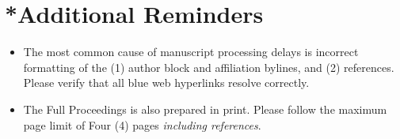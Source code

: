 \documentclass[10pt,a4paper,twoside]{article}
\begin{document}
\section*{*Additional Reminders}
\begin{itemize}
    \item The most common cause of manuscript processing delays is incorrect formatting of the (1) author block and affiliation bylines, and (2) references. Please verify that all blue web hyperlinks resolve correctly.
    \item The Full Proceedings is also prepared in print. Please follow the maximum page limit of Four (4) pages \textit{including references}. 
\end{itemize}



\end{document}
